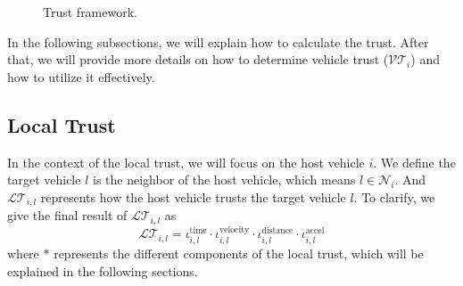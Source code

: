 \documentclass[letterpaper, 10pt, conference]{ieeeconf}  %
\def\N{\mathcal{N}} %
\def\LT{\mathcal{LT}} %
\def\VT{\mathcal{VT}} %
\begin{document}
\begin{figure}[h!]
    \caption{Trust framework.}
    \label{fig_trust_framework}
\end{figure}


In the following subsections, we will explain how to calculate the trust. After that, we will provide more details on how to determine vehicle trust ($\VT_{i}$) and how to utilize it effectively.

\subsection{Local Trust}

In the context of the local trust, we will focus on the host vehicle $i$. We define the target vehicle $l$ is the neighbor of the host vehicle, which means $l \in {\N}_{i}$. And $\LT_{i,l}$ represents how the host vehicle trusts the target vehicle $l$. 
To clarify, we give the final result of $\LT_{i,l}$ as
\begin{equation}
    \LT_{i,l}= \iota_{i,l}^\text{time} \cdot \iota_{i,l}^\text{velocity} \cdot \iota_{i,l}^\text{distance} \cdot \iota_{i,l}^{\text{accel}} 
\end{equation}
where $*$ represents the different components of the local trust, which will be explained in the following sections.
\end{document}
